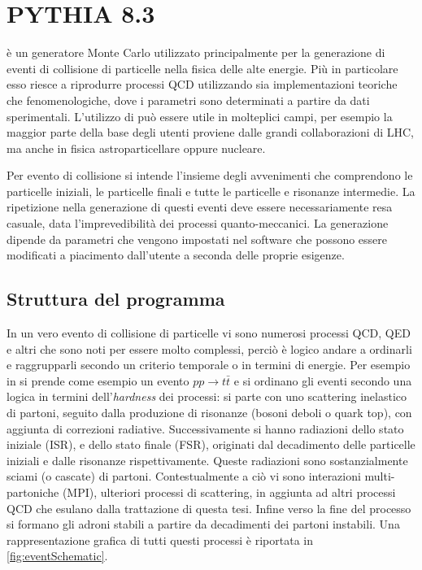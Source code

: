 \section{PYTHIA 8.3}
\pythiaa{} \cite{pythia8300} è un generatore Monte Carlo utilizzato principalmente per la generazione di eventi di collisione di particelle nella fisica delle alte energie. 
Più in particolare esso riesce a riprodurre processi QCD utilizzando sia implementazioni teoriche che fenomenologiche, dove i parametri sono determinati a partire da dati sperimentali. 
L'utilizzo di \pythiaa{} può essere utile in molteplici campi, per esempio la maggior parte della base degli utenti proviene dalle grandi collaborazioni di LHC, ma anche in fisica astroparticellare oppure nucleare.

Per evento di collisione si intende l'insieme degli avvenimenti che comprendono le particelle iniziali, le particelle finali e tutte le particelle e risonanze intermedie.
La ripetizione nella generazione di questi eventi deve essere necessariamente resa casuale, data l'imprevedibilità dei processi quanto-meccanici.
La generazione dipende da parametri che vengono impostati nel software che possono essere modificati a piacimento dall'utente a seconda delle proprie esigenze.

\subsection{Struttura del programma}
In un vero evento di collisione di particelle vi sono numerosi processi QCD, QED e altri che sono noti per essere molto complessi, perciò è logico andare a ordinarli e raggrupparli secondo un criterio temporale o in termini di energie.
Per esempio in \cite{pythia8300} si prende come esempio un evento $pp\to t\bar t$ e si ordinano gli eventi secondo una logica in termini dell'\textit{hardness} dei processi:
si parte con uno scattering inelastico di partoni, seguito dalla produzione di risonanze (bosoni deboli o quark top), con aggiunta di correzioni radiative.
Successivamente si hanno radiazioni dello stato iniziale (ISR), e dello stato finale (FSR), originati dal decadimento delle particelle iniziali e dalle risonanze rispettivamente.
Queste radiazioni sono sostanzialmente sciami (o cascate) di partoni.
Contestualmente a ciò vi sono interazioni multi-partoniche (MPI), ulteriori processi di scattering, in aggiunta ad altri processi QCD che esulano dalla trattazione di questa tesi. 
Infine verso la fine del processo si formano gli adroni stabili a partire da decadimenti dei partoni instabili.
Una rappresentazione grafica di tutti questi processi è riportata in \autoref{fig:eventSchematic}.

